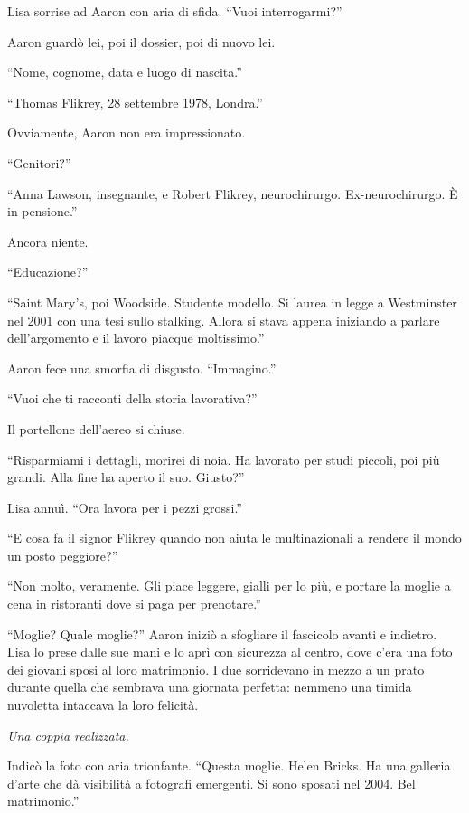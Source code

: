\documentclass[a4paper,oneside,11pt]{memoir}
\begin{document}
Lisa sorrise ad Aaron con aria di sfida. ``Vuoi interrogarmi?''

Aaron guardò lei, poi il dossier, poi di nuovo lei.

``Nome, cognome, data e luogo di nascita.''

``Thomas Flikrey, 28 settembre 1978, Londra.''

Ovviamente, Aaron non era impressionato.

``Genitori?''

``Anna Lawson, insegnante, e Robert Flikrey, neurochirurgo. Ex-neurochirurgo. È
in pensione.''

Ancora niente.

``Educazione?''


``Saint Mary's, poi Woodside. Studente modello. Si laurea in legge a Westminster
nel 2001 con una tesi sullo stalking. Allora si stava appena iniziando a parlare
dell'argomento e il lavoro piacque moltissimo.''

Aaron fece una smorfia di disgusto. ``Immagino.''

``Vuoi che ti racconti della storia lavorativa?''

Il portellone dell'aereo si chiuse.

``Risparmiami i dettagli, morirei di noia. Ha lavorato per studi piccoli, poi
più grandi. Alla fine ha aperto il suo. Giusto?''

Lisa annuì. ``Ora lavora per i pezzi grossi.''

``E cosa fa il signor Flikrey quando non aiuta le multinazionali a rendere il
mondo un posto peggiore?''

``Non molto, veramente. Gli piace leggere, gialli per lo più, e portare la
moglie a cena in ristoranti dove si paga per prenotare.''

``Moglie? Quale moglie?'' Aaron iniziò a sfogliare il fascicolo avanti e
indietro. Lisa lo prese dalle sue mani e lo aprì con sicurezza al centro, dove
c'era una foto dei giovani sposi al loro matrimonio. I due sorridevano in mezzo
a un prato durante quella che sembrava una giornata perfetta: nemmeno una timida
nuvoletta intaccava la loro felicità.

\emph{Una coppia realizzata.}

Indicò la foto con aria trionfante. ``Questa moglie. Helen Bricks. Ha una
galleria d'arte che dà visibilità a fotografi emergenti. Si sono sposati nel
2004. Bel matrimonio.''
\end{document}
